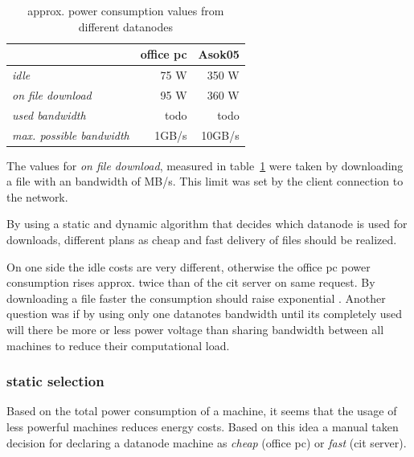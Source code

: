 \begin{table}
	\centering
	\caption{approx. power consumption values from different datanodes}	
	\begin{tabular}{|l|r|r|}
		\hline \rule[-2ex]{0pt}{5.5ex}  & \textbf{office pc} & \textbf{Asok05} \\ 
		\hline \rule[-2ex]{0pt}{5.5ex} \textit{idle} &   75 W &   350 W \\ 
		\hline \rule[-2ex]{0pt}{5.5ex} \textit{on file download} &   95 W &   360 W \\ 
		\hline \rule[-2ex]{0pt}{5.5ex} \textit{used bandwidth} & todo & todo \\
		\hline \rule[-2ex]{0pt}{5.5ex} \textit{max. possible bandwidth} & 1GB/s & 10GB/s \\
		\hline
	\end{tabular} 
	\label{tab:powerconsumptionvalues}
\end{table}

The values for \textit{on file download}, measured in table~\ref{tab:powerconsumptionvalues} were taken by downloading a file with an bandwidth of  MB/s. This limit was set by the client connection to the network.

By using a static and dynamic algorithm that decides which datanode is used for downloads, different plans as cheap and fast delivery of files should be realized.

On one side the idle costs are very different, otherwise the office pc power consumption rises approx. twice than of the cit server on same request. By downloading a file faster the consumption should raise exponential . Another question was if by using only one datanotes bandwidth until its completely used will there be more or less power voltage than sharing bandwidth between all machines to reduce their computational load. 

\subsubsection{static selection}

Based on the total power consumption of a machine, it seems that the usage of less powerful machines reduces energy costs. Based on this idea a manual taken decision for declaring a datanode machine as \textit{cheap} (office pc) or \textit{fast} (cit server). 

